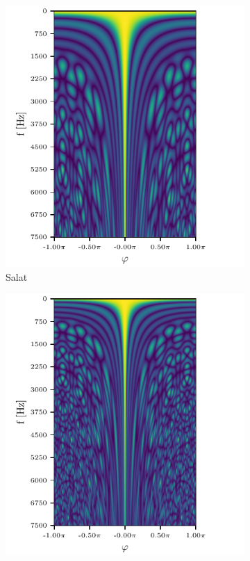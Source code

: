 \begin{figure}[h]
	\centering
	\begin{subfigure}[t]{0.45\textwidth}
		\centering
		\includegraphics[width=\textwidth]{circ_f_sweep_0.pdf}
		\caption{Salat}
		\label{ssl:fig:f_dep0}
	\end{subfigure}
	\hfill
	\begin{subfigure}[t]{0.45\textwidth}
		\centering
		\includegraphics[width=\textwidth]{circ_f_sweep_1.pdf}

\end{subfigure}
\end{figure}
